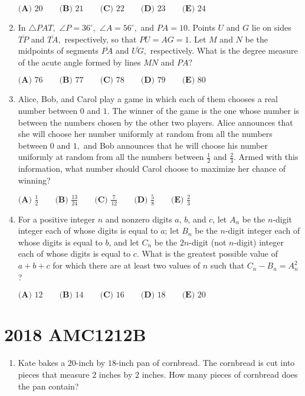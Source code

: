 \documentclass{article}
\begin{document}
\begin{enumerate}[label=\arabic*., itemsep=0.5em]
$\textbf{(A) } 20 \qquad 
\textbf{(B) } 21 \qquad 
\textbf{(C) } 22 \qquad 
\textbf{(D) } 23 \qquad 
\textbf{(E) } 24 $\par \vspace{0.5em}\item In $\triangle PAT,$ $\angle P=36^{\circ},$ $\angle A=56^{\circ},$ and $PA=10.$ Points $U$ and $G$ lie on sides $\overline{TP}$ and $\overline{TA},$ respectively, so that $PU=AG=1.$ Let $M$ and $N$ be the midpoints of segments $\overline{PA}$ and $\overline{UG},$ respectively. What is the degree measure of the acute angle formed by lines $MN$ and $PA?$

$\textbf{(A) } 76 \qquad 
\textbf{(B) } 77 \qquad 
\textbf{(C) } 78 \qquad 
\textbf{(D) } 79 \qquad 
\textbf{(E) } 80 $\par \vspace{0.5em}\item Alice, Bob, and Carol play a game in which each of them chooses a real number between $0$ and $1.$ The winner of the game is the one whose number is between the numbers chosen by the other two players. Alice announces that she will choose her number uniformly at random from all the numbers between $0$ and $1,$ and Bob announces that he will choose his number uniformly at random from all the numbers between $\tfrac{1}{2}$ and $\tfrac{2}{3}.$ Armed with this information, what number should Carol choose to maximize her chance of winning?

$
\textbf{(A) }\frac{1}{2}\qquad
\textbf{(B) }\frac{13}{24} \qquad
\textbf{(C) }\frac{7}{12} \qquad
\textbf{(D) }\frac{5}{8} \qquad
\textbf{(E) }\frac{2}{3}\qquad
$\par \vspace{0.5em}\item For a positive integer $n$ and nonzero digits $a$, $b$, and $c$, let $A_n$ be the $n$-digit integer each of whose digits is equal to $a$; let $B_n$ be the $n$-digit integer each of whose digits is equal to $b$, and let $C_n$ be the $2n$-digit (not $n$-digit) integer each of whose digits is equal to $c$. What is the greatest possible value of $a + b + c$ for which there are at least two values of $n$ such that $C_n - B_n = A_n^2$?

$\textbf{(A) } 12 \qquad \textbf{(B) } 14 \qquad \textbf{(C) } 16 \qquad \textbf{(D) } 18 \qquad \textbf{(E) } 20$\par \vspace{0.5em}\end{enumerate}\newpage\section*{2018 AMC1212B}\begin{enumerate}[label=\arabic*., itemsep=0.5em]\item Kate bakes a $20$-inch by $18$-inch pan of cornbread. The cornbread is cut into pieces that measure $2$ inches by $2$ inches. How many pieces of cornbread does the pan contain?


\end{enumerate}
\end{document}
